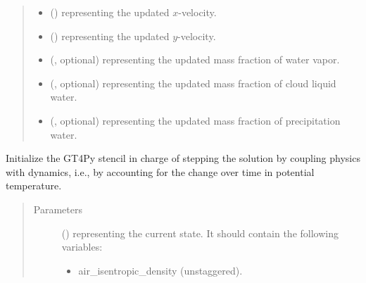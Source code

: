 \documentclass[letterpaper,10pt,english]{sphinxmanual}
\begin{document}
\begin{fulllineitems}
\begin{fulllineitems}
\begin{quote}
\begin{description}
\begin{itemize}
\item {} 
 () \textendash{}  representing the updated \(x\)-velocity.

\item {} 
 () \textendash{}  representing the updated \(y\)-velocity.

\item {} 
 (, optional) \textendash{}  representing the updated mass fraction of water vapor.

\item {} 
 (, optional) \textendash{}  representing the updated mass fraction of cloud liquid water.

\item {} 
 (, optional) \textendash{}  representing the updated mass fraction of precipitation water.

\end{itemize}


\end{description}\end{quote}

\end{fulllineitems}


\begin{fulllineitems}
\label{\detokenize{api:dycore.prognostic_isentropic_nonconservative.PrognosticIsentropicNonconservative._stencil_stepping_by_coupling_physics_with_dynamics_initialize}}
Initialize the GT4Py stencil in charge of stepping the solution by coupling physics with dynamics,
i.e., by accounting for the change over time in potential temperature.
\begin{quote}\begin{description}
\item[{Parameters}] \leavevmode
{} () \textendash{} 
 representing the current state.
It should contain the following variables:
\begin{itemize}
\item {} 
air\_isentropic\_density (unstaggered).


\end{itemize}
\end{description}
\end{quote}
\end{fulllineitems}
\end{fulllineitems}
\end{document}

